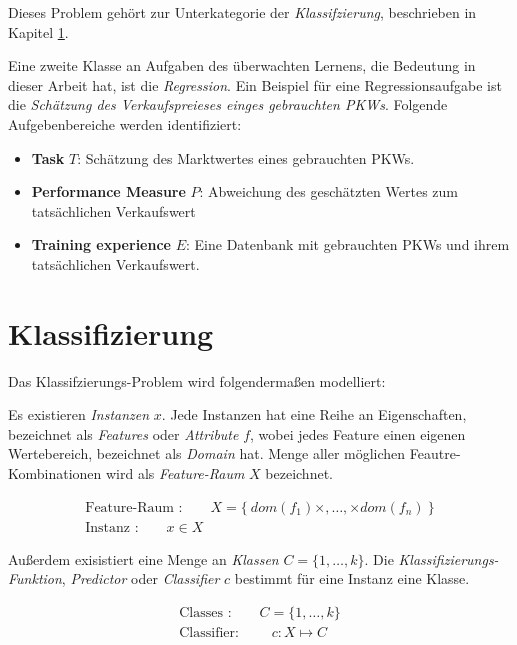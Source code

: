 Dieses Problem gehört zur Unterkategorie der \emph{Klassifzierung}, beschrieben in Kapitel \ref{sec:classification}. 

Eine zweite Klasse an Aufgaben des überwachten Lernens, die  Bedeutung in dieser Arbeit hat, ist die \emph{Regression}. Ein Beispiel für eine Regressionsaufgabe ist die \emph{Schätzung des Verkaufspreieses einges gebrauchten PKWs}. Folgende Aufgebenbereiche werden identifiziert:

\begin{itemize}
	\item \textbf{Task} $T$: Schätzung des Marktwertes eines gebrauchten PKWs. 
	\item \textbf{Performance Measure} $P$: Abweichung des geschätzten Wertes zum tatsächlichen Verkaufswert
	\item \textbf{Training experience} $E$: Eine Datenbank mit gebrauchten PKWs und ihrem tatsächlichen Verkaufswert.
\end{itemize}

\section{Klassifizierung}
\label{sec:classification}

Das Klassifzierungs-Problem wird folgendermaßen modelliert: 

Es existieren \emph{Instanzen} $x$. Jede Instanzen hat eine Reihe an Eigenschaften, bezeichnet als \emph{Features} oder \emph{Attribute} $f$, wobei jedes Feature einen eigenen Wertebereich, bezeichnet als \emph{Domain} hat. Menge aller möglichen Feautre-Kombinationen wird als \emph{Feature-Raum} $X$ bezeichnet.  

\begin{equation}
\label{eq:feature-space}
\begin{gathered}
\text{Feature-Raum :} \qquad X = \{\  dom(f_1) \times , \ldots, \times dom(f_n)\ \} \\
\text{Instanz :} \qquad  x \in X 
\end{gathered}
\end{equation}

Außerdem exisistiert eine Menge an \emph{Klassen} $C = \{1, \ldots , k\}$. Die \emph{Klassifizierungs-Funktion}, \emph{Predictor}  oder \emph{Classifier} $c$ bestimmt für eine Instanz eine Klasse.

\begin{equation}
\label{eq:classifier-classes}
\begin{gathered}
\text{Classes :} \qquad C = \{ 1 , \ldots , k \} \\
\text{Classifier: } \qquad  c: X \mapsto C
\end{gathered}
\end{equation}


